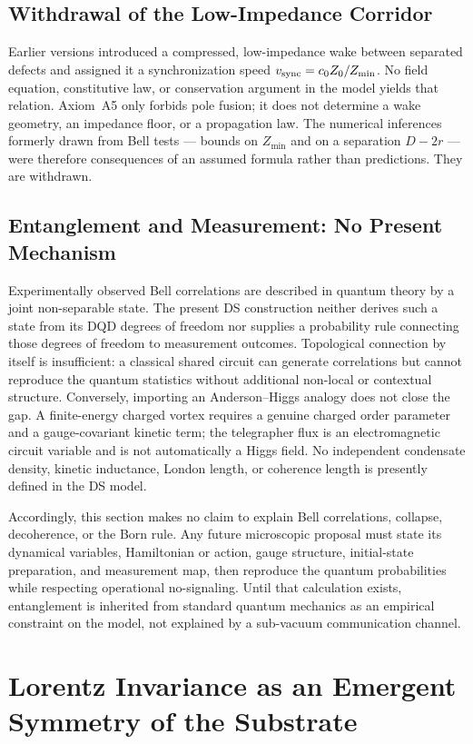 \documentclass[11pt,a4paper]{article}
\theoremstyle{plain}
\theoremstyle{remark}
\begin{document}
\subsection{Withdrawal of the Low-Impedance Corridor}
Earlier versions introduced a compressed, low-impedance wake between separated defects and assigned it a synchronization speed $v_{\rm sync}=c_0 Z_0/Z_{\min}$. No field equation, constitutive law, or conservation argument in the model yields that relation. Axiom~A5 only forbids pole fusion; it does not determine a wake geometry, an impedance floor, or a propagation law. The numerical inferences formerly drawn from Bell tests --- bounds on $Z_{\min}$ and on a separation $D-2r$ --- were therefore consequences of an assumed formula rather than predictions. They are withdrawn.

\subsection{Entanglement and Measurement: No Present Mechanism}
Experimentally observed Bell correlations are described in quantum theory by a joint non-separable state. The present DS construction neither derives such a state from its DQD degrees of freedom nor supplies a probability rule connecting those degrees of freedom to measurement outcomes. Topological connection by itself is insufficient: a classical shared circuit can generate correlations but cannot reproduce the quantum statistics without additional non-local or contextual structure. Conversely, importing an Anderson--Higgs analogy does not close the gap. A finite-energy charged vortex requires a genuine charged order parameter and a gauge-covariant kinetic term; the telegrapher flux is an electromagnetic circuit variable and is not automatically a Higgs field. No independent condensate density, kinetic inductance, London length, or coherence length is presently defined in the DS model.

Accordingly, this section makes no claim to explain Bell correlations, collapse, decoherence, or the Born rule. Any future microscopic proposal must state its dynamical variables, Hamiltonian or action, gauge structure, initial-state preparation, and measurement map, then reproduce the quantum probabilities while respecting operational no-signaling. Until that calculation exists, entanglement is inherited from standard quantum mechanics as an empirical constraint on the model, not explained by a sub-vacuum communication channel.

\section{Lorentz Invariance as an Emergent Symmetry of the Substrate}
\label{sec:lorentz}
\end{document}
